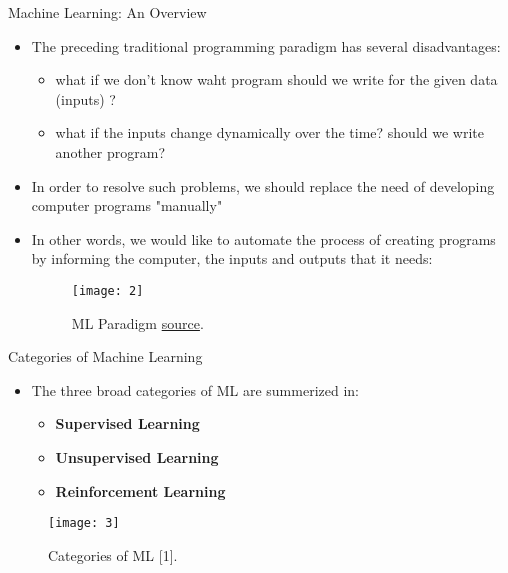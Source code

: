 \documentclass[compress,oilve]{beamer}
\begin{document}
\begin{frame}{Machine Learning: An Overview}
\begin{itemize}
\item The preceding traditional programming paradigm has several disadvantages:
	\begin{itemize}
	\item what if we don't know waht program should we write for the given data (inputs) ?
	\item what if the inputs change dynamically over the time? should we write another program? 
	\end{itemize}
\item In order to resolve such problems, we should replace the need of developing computer programs "manually"
\item In other words, we would like to automate the process of creating programs by informing the computer, the inputs and outputs that it needs:
\begin{center}
\begin{figure}
\texttt{[image: 2]}
\center \caption{ML Paradigm \href{https://sebastianraschka.com/faq/docs/datascience-ml.html}{source}.}
\end{figure}
\end{center}
\end{itemize}
\end{frame}





\begin{frame}{Categories of Machine Learning}
\begin{itemize}
\item The three broad categories of ML are summerized in:
\begin{itemize}
\item \textbf{Supervised Learning}
\item \textbf{Unsupervised Learning}  
\item \textbf{Reinforcement Learning} 
\end{itemize}
\end{itemize}
\begin{figure}
\texttt{[image: 3]}
\caption{Categories of ML [1].}
\end{figure}
\end{frame}
\end{document}
